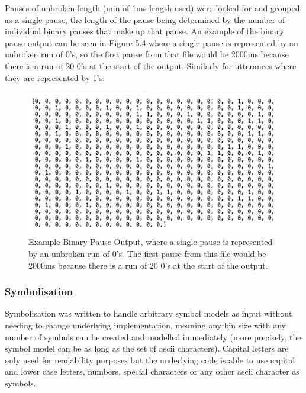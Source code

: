 Pauses of unbroken length (min of 1ms length used) were looked for and grouped as a single pause, the length of the pause being determined by the number of individual binary pauses that make up that pause. An example of the binary pause output can be seen in Figure 5.4 where a single pause is represented by an unbroken run of 0's, so the first pause from that file would be 2000ms because there is a run of 20 0's at the start of the output. Similarly for utterances where they are represented by 1's. %

\begin{figure}[htbp]
	\begin{center}
		\includegraphics[scale=0.6]{src/main-matter/methodology/code-base/output/binary_pause}
		\caption{Example Binary Pause Output, where a single pause is represented by an unbroken run of 0's. The first pause from this file would be 2000ms because there is a run of 20 0's at the start of the output.}
		\label{default}
	\end{center}
\end{figure}


\subsubsection{Symbolisation}
Symbolisation was written to handle arbitrary symbol models as input without needing to change underlying implementation, meaning any bin size with any number of symbols can be created and modelled immediately (more precisely, the symbol model can be as long as the set of ascii characters). Capital letters are only used for readability purposes but the underlying code is able to use capital and lower case letters, numbers, special characters or any other ascii character as symbols. \\

